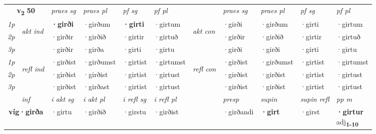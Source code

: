 \noindent
\begin{tabular}{lllllllllll} \toprule
\multicolumn{2}{c}{\textbf{v{\textsubscript{2}}} \Large{\textbf{50}}}  &  \textit{praes sg}  & \textit{praes pl}  &\textit{ pf sg} & \textit{pf pl} &  &  \textit{praes sg}  & \textit{praes pl}  & \textit{pf sg} & \textit{pf pl } \\*
	\cmidrule{3-6} \cmidrule{8-11}
 {\textit{1p}} & \multirow{3}{*}{\begin{turn}{90}\textit{akt ind}\end{turn}} & \textbf{·girði} & ·girðum & \textbf{·girti} & ·girtum & \multirow{3}{*}{\begin{turn}{90}\textit{akt con}\end{turn}} &·girði & ·girðum & ·girti & ·girtum\\*
 {\textit{2p}} &  &  ·girðir  & ·girðið & ·girtir & ·girtuð & & ·girðir & ·girðið & ·girtir & ·girtuð \\*
{\textit{3p}} &  & ·girðir & ·girða & ·girti & ·girtu & & ·girði & ·girði& ·girti & ·girtu \\*
\cmidrule{3-6} \cmidrule{8-11}
 {\textit{1p}} & \multirow{3}{*}{\begin{turn}{90}\textit{refl ind}\end{turn}}  & ·girðist & ·girðumst & ·girtist & ·girtumst & \multirow{3}{*}{\begin{turn}{90}\textit{refl con}\end{turn}}  &·girðist & ·girðumst & ·girtist & ·girtumst \\*
 {\textit{2p}} &  & ·girðist & ·girðist & ·girtist & ·girtust & &·girðist & ·girðist & ·girtist & ·girtust \\*
 {\textit{3p}}  & & ·girðist & ·girðast & ·girtist & ·girtust & & ·girðist & ·girðist& ·girtist & ·girtust \\*
\cmidrule{3-6} \cmidrule{8-11}

   \multicolumn{2}{c}{\textit{inf}}  & \textit{i akt sg} & \textit{i akt pl} & \textit{i refl sg} & \textit{i refl pl} && \textit{presp} & \textit{supin} & \textit{supin refl} & \textit{pp m} \\*
  \multicolumn{2}{c}{\textbf{víg\allowbreak ·girða}} & ·girtu  & ·girðið & ·girstu & ·girðist && ·girðandi &  \textbf{·girt} & ·girst & \specialcell{\textbf{·girtur} \\ adj\textbf{\textsubscript{1-10}}} \\*
\end{tabular}

